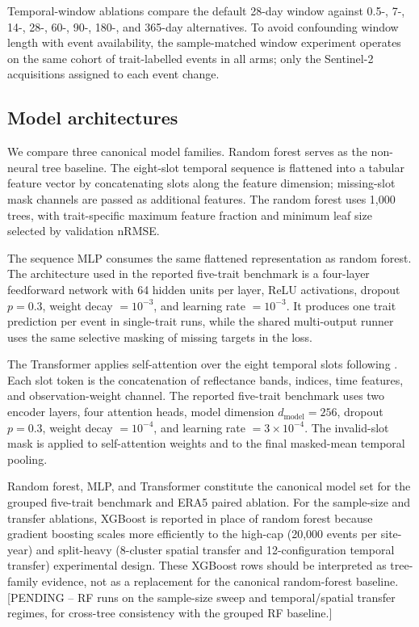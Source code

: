 \documentclass[final,times,onecolumn, authoryear]{elsarticle}
\begin{document}
\begin{linenumbers}
Temporal-window ablations compare the default 28-day window against 0.5-, 7-, 14-, 28-, 60-, 90-, 180-, and 365-day alternatives. To avoid confounding window length with event availability, the sample-matched window experiment operates on the same cohort of trait-labelled events in all arms; only the Sentinel-2 acquisitions assigned to each event change.

\subsection{Model architectures}

We compare three canonical model families. Random forest \citep{breiman2001random} serves as the non-neural tree baseline. The eight-slot temporal sequence is flattened into a tabular feature vector by concatenating slots along the feature dimension; missing-slot mask channels are passed as additional features. The random forest uses 1,000 trees, with trait-specific maximum feature fraction and minimum leaf size selected by validation nRMSE.

The sequence MLP consumes the same flattened representation as random forest. The architecture used in the reported five-trait benchmark is a four-layer feedforward network with 64 hidden units per layer, ReLU activations, dropout $p=0.3$, weight decay $=10^{-3}$, and learning rate $=10^{-3}$. It produces one trait prediction per event in single-trait runs, while the shared multi-output runner uses the same selective masking of missing targets in the loss.

The Transformer applies self-attention over the eight temporal slots following \citet{vaswani2017attention}. Each slot token is the concatenation of reflectance bands, indices, time features, and observation-weight channel. The reported five-trait benchmark uses two encoder layers, four attention heads, model dimension $d_{\mathrm{model}}=256$, dropout $p=0.3$, weight decay $=10^{-4}$, and learning rate $=3 \times 10^{-4}$. The invalid-slot mask is applied to self-attention weights and to the final masked-mean temporal pooling.

Random forest, MLP, and Transformer constitute the canonical model set for the grouped five-trait benchmark and ERA5 paired ablation. For the sample-size and transfer ablations, XGBoost is reported in place of random forest because gradient boosting scales more efficiently to the high-cap (20,000 events per site-year) and split-heavy (8-cluster spatial transfer and 12-configuration temporal transfer) experimental design. These XGBoost rows should be interpreted as tree-family evidence, not as a replacement for the canonical random-forest baseline. [PENDING -- RF runs on the sample-size sweep and temporal/spatial transfer regimes, for cross-tree consistency with the grouped RF baseline.]


\end{linenumbers}
\end{document}
